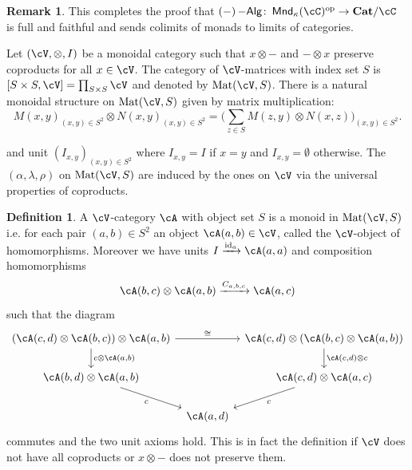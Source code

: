 \documentclass[a4paper,11pt,oneside,openany]{scrbook}
\newcommand{\catname}[1]{{\normalfont\textbf{#1}}}
\DeclareMathOperator{\Alg}{-\mathsf{Alg}}
\newcommand{\Cat}{\catname{Cat}}
\newcommand{\from}{\colon}
\DeclareMathOperator{\Mnd}{\mathsf{Mnd}}
\DeclareMathOperator{\id}{id}
\DeclareMathOperator{\Mat}{Mat}
\theoremstyle{definition}
\theoremstyle{definition}
\newtheorem{defn}[thm]{Definition} %
\newtheorem{rmk}[thm]{Remark}
\begin{document}
\begin{rmk}
    This completes the proof that $ (-)\Alg \from \Mnd_\kappa(\cC)^{\text{op}} \to \Cat/\cC$ is full and faithful and sends colimits of monads to limits of categories.
\end{rmk}
Let $ (\cV,\otimes, I) $ be a monoidal category such that $ x\otimes - $ and $ -\otimes x $ preserve coproducts for all $ x\in\cV$.
The category of $\cV$-matrices with index set $ S $ is $ [S\times S,\cV] =\prod_{S\times S}\cV $ and denoted by $ \Mat(\cV ,     S) $. There is a natural monoidal structure on $ \Mat(\cV,S) $ given by matrix multiplication:
\begin{displaymath}
    M(x,y)_{(x,y) \in S^2} \otimes N(x,y)_{(x,y) \in S^2} = \Big(\sum_{z\in S} M(z,y)\otimes N(x,z) \Big)_{(x,y)\in S^2}.
\end{displaymath}

and unit $ (I_{x,y})_{(x,y) \in S^2} $ where $ I_{x,y}= I $ if $ x = y $ and $ I_{x,y} = \emptyset $ otherwise.
The $ (\alpha,\lambda,\rho) $ on $ \Mat(\cV , S) $ are induced by the ones on $\cV$ via the universal properties of coproducts.

\begin{defn}
    A $\cV$-category $ \cA $ with object set $ S $ is a monoid in $ \Mat(\cV,S) $ 
    i.e. for each pair $ (a,b) \in S^2 $ an object $ \cA(a,b) \in\cV$, called the $\cV$-object of homomorphisms.
    Moreover we have units $ I\xrightarrow{\id_a} \cA(a,a) $ and composition homomorphisms
    \begin{displaymath}
    \cA(b,c) \otimes \cA(a,b) \xrightarrow{C_{a,b,c}} \cA(a,c)
    \end{displaymath}
    such that the diagram
\begin{displaymath}
    \begin{tikzcd}[column sep=tiny]
    (\cA(c,d)\otimes \cA(b,c)) \otimes \cA(a,b)
    \arrow[d,"{c\otimes \cA(a,b)}"]\arrow[rr, "\cong"]
    &&
    \cA(c,d) \otimes (\cA(b,c) \otimes \cA(a,b) )  
    \arrow[d,"{\cA(c,d)\otimes c}"]\\
    \cA(b,d)\otimes \cA(a,b)
    \arrow[rd, "c"']
    &&
    \cA(c,d)\otimes \cA(a,c)
    \arrow[ld, "c"]
    \\
    & \cA(a,d)
    \end{tikzcd}
\end{displaymath}
commutes and the two unit axioms hold.
This is in fact the definition if $\cV$ does not have all coproducts or $ x\otimes - $ does not preserve them.
\end{defn}
\end{document}

